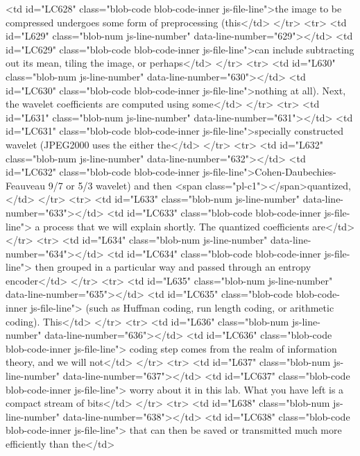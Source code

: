         <td id="LC628" class="blob-code blob-code-inner js-file-line">the image to be compressed undergoes some form of preprocessing (this</td>
      </tr>
      <tr>
        <td id="L629" class="blob-num js-line-number" data-line-number="629"></td>
        <td id="LC629" class="blob-code blob-code-inner js-file-line">can include subtracting out its mean, tiling the image, or perhaps</td>
      </tr>
      <tr>
        <td id="L630" class="blob-num js-line-number" data-line-number="630"></td>
        <td id="LC630" class="blob-code blob-code-inner js-file-line">nothing at all). Next, the wavelet coefficients are computed using some</td>
      </tr>
      <tr>
        <td id="L631" class="blob-num js-line-number" data-line-number="631"></td>
        <td id="LC631" class="blob-code blob-code-inner js-file-line">specially constructed wavelet (JPEG2000 uses the either the</td>
      </tr>
      <tr>
        <td id="L632" class="blob-num js-line-number" data-line-number="632"></td>
        <td id="LC632" class="blob-code blob-code-inner js-file-line">Cohen-Daubechies-Feauveau 9/7 or 5/3 wavelet) and then <span class="pl-c1">\textit</span>{quantized},</td>
      </tr>
      <tr>
        <td id="L633" class="blob-num js-line-number" data-line-number="633"></td>
        <td id="LC633" class="blob-code blob-code-inner js-file-line"> a process that we will explain shortly. The quantized coefficients are</td>
      </tr>
      <tr>
        <td id="L634" class="blob-num js-line-number" data-line-number="634"></td>
        <td id="LC634" class="blob-code blob-code-inner js-file-line"> then grouped in a particular way and passed through an entropy encoder</td>
      </tr>
      <tr>
        <td id="L635" class="blob-num js-line-number" data-line-number="635"></td>
        <td id="LC635" class="blob-code blob-code-inner js-file-line"> (such as Huffman coding, run length coding, or arithmetic coding). This</td>
      </tr>
      <tr>
        <td id="L636" class="blob-num js-line-number" data-line-number="636"></td>
        <td id="LC636" class="blob-code blob-code-inner js-file-line"> coding step comes from the realm of information theory, and we will not</td>
      </tr>
      <tr>
        <td id="L637" class="blob-num js-line-number" data-line-number="637"></td>
        <td id="LC637" class="blob-code blob-code-inner js-file-line"> worry about it in this lab. What you have left is a compact stream of bits</td>
      </tr>
      <tr>
        <td id="L638" class="blob-num js-line-number" data-line-number="638"></td>
        <td id="LC638" class="blob-code blob-code-inner js-file-line"> that can then be saved or transmitted much more efficiently than the</td>
